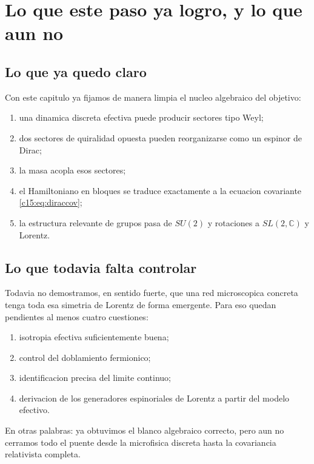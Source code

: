 \section{Lo que este paso ya logro, y lo que aun no}
\subsection{Lo que ya quedo claro}
Con este capitulo ya fijamos de manera limpia el nucleo algebraico del objetivo:
\begin{enumerate}[label=\arabic*.]
    \item una dinamica discreta efectiva puede producir sectores tipo Weyl;
    \item dos sectores de quiralidad opuesta pueden reorganizarse como un espinor de Dirac;
    \item la masa acopla esos sectores;
    \item el Hamiltoniano en bloques se traduce exactamente a la ecuacion covariante \eqref{c15:eq:diraccov};
    \item la estructura relevante de grupos pasa de $SU(2)$ y rotaciones a $SL(2,\mathbb{C})$ y Lorentz.
\end{enumerate}

\subsection{Lo que todavia falta controlar}
Todavia no demostramos, en sentido fuerte, que una red microscopica concreta tenga toda esa simetria de Lorentz de forma emergente. Para eso quedan pendientes al menos cuatro cuestiones:
\begin{enumerate}[label=\arabic*.]
    \item isotropia efectiva suficientemente buena;
    \item control del doblamiento fermionico;
    \item identificacion precisa del limite continuo;
    \item derivacion de los generadores espinoriales de Lorentz a partir del modelo efectivo.
\end{enumerate}

En otras palabras: ya obtuvimos el blanco algebraico correcto, pero aun no cerramos todo el puente desde la microfisica discreta hasta la covariancia relativista completa.

